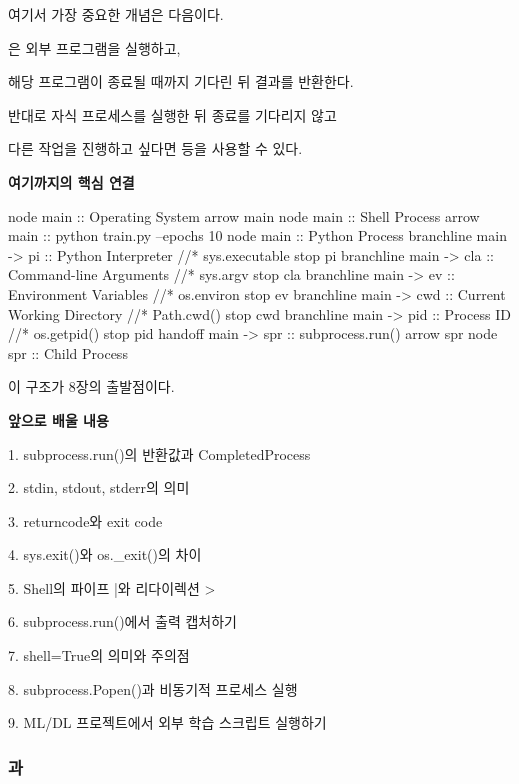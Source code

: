여기서 가장 중요한 개념은 다음이다.

\begin{dhknote}
\begin{dhksmry}[centered]
은 외부 프로그램을 실행하고,

해당 프로그램이 종료될 때까지 기다린 뒤 결과를 반환한다.
\end{dhksmry}
\end{dhknote}

반대로 자식 프로세스를 실행한 뒤 종료를 기다리지 않고

다른 작업을 진행하고 싶다면  등을 사용할 수 있다.

\textbf{여기까지의 핵심 연결}

\begin{dhkbranch}[in=8]
node main :: Operating System
arrow main
node main :: Shell Process
arrow main :: python train.py --epochs 10
node main :: Python Process
branchline main -> pi :: Python Interpreter //* sys.executable
stop pi
branchline main -> cla :: Command-line Arguments //* sys.argv
stop cla
branchline main -> ev :: Environment Variables //* os.environ
stop ev
branchline main -> cwd :: Current Working Directory //* Path.cwd()
stop cwd
branchline main -> pid :: Process ID //* os.getpid()
stop pid
handoff main -> spr :: subprocess.run()
arrow spr
node spr :: Child Process
\end{dhkbranch}

이 구조가 8장의 출발점이다.

\textbf{앞으로 배울 내용}

\begin{dhksmry}
    1. subprocess.run()의 반환값과 CompletedProcess
    
    2. stdin, stdout, stderr의 의미
    
    3. returncode와 exit code
    
    4. sys.exit()와 os._exit()의 차이
    
    5. Shell의 파이프 |와 리다이렉션 >
    
    6. subprocess.run()에서 출력 캡처하기
    
    7. shell=True의 의미와 주의점
    
    8. subprocess.Popen()과 비동기적 프로세스 실행
    
    9. ML/DL 프로젝트에서 외부 학습 스크립트 실행하기
\end{dhksmry}

\subsubsection{과 }

